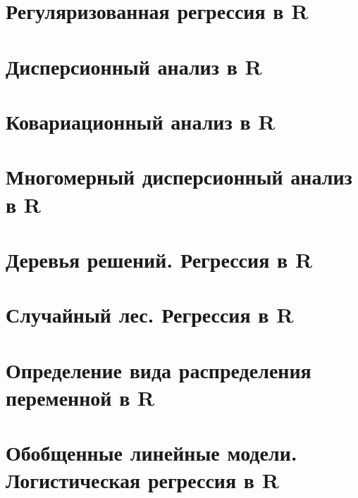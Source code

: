 \documentclass[
  letterpaper,
]{scrbook}
\theoremstyle{definition}
\theoremstyle{remark}
\begin{document}

\chapter{Регуляризованная регрессия в R}\label{randan-regreg}


\chapter{Дисперсионный анализ в R}\label{randan-anova}


\chapter{Ковариационный анализ в R}\label{randan-ancova}


\chapter{Многомерный дисперсионный анализ в R}\label{randan-manova}


\chapter{Деревья решений. Регрессия в R}\label{randan-treesreg}


\chapter{Случайный лес. Регрессия в R}\label{randan-randforestreg}


\chapter{Определение вида распределения переменной в
R}\label{randan-distributions}


\chapter{Обобщенные линейные модели. Логистическая регрессия в
R}\label{randan-logreg}
\end{document}
